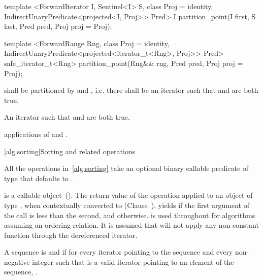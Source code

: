 %
\begin{itemdecl}
template <ForwardIterator I, Sentinel<I> S, class Proj = identity,
    IndirectUnaryPredicate<projected<I, Proj>> Pred>
  I partition_point(I first, S last, Pred pred, Proj proj = Proj{});

template <ForwardRange Rng, class Proj = identity,
    IndirectUnaryPredicate<projected<iterator_t<Rng>, Proj>> Pred>
  safe_iterator_t<Rng>
    partition_point(Rng&& rng, Pred pred, Proj proj = Proj{});
\end{itemdecl}

\begin{itemdescr}
\pnum
\requires {} shall be partitioned by  and , i.e.
there shall be an iterator  such that
 and 
are both true.

\pnum
\returns An iterator  such that  and
 are both true.

\pnum
\complexity {} applications of  and .
\end{itemdescr}


[alg.sorting]{Sorting and related operations}

\pnum
All the operations in~\ref{alg.sorting} take an optional binary callable predicate of type  that defaults to .

\pnum
{}
is a callable object~(). The return value of the  operation applied to
an object of type , when contextually converted to
 (Clause~),
yields  if the first argument of the call
is less than the second, and
otherwise.
is used throughout for algorithms assuming an ordering relation.
It is assumed that
will not apply any non-constant function through the dereferenced iterator.

\pnum
A sequence is
 and  if for every iterator
pointing to the sequence and every non-negative integer
such that
is a valid iterator pointing to an element of the sequence,
.

